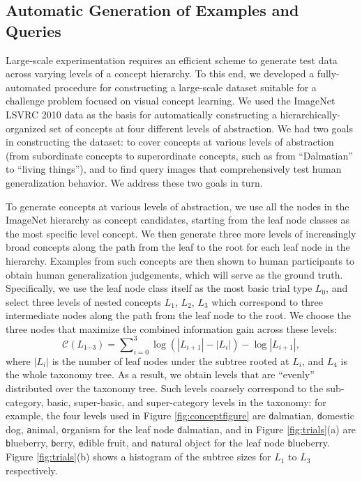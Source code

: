 \subsection{Automatic Generation of Examples and Queries}

Large-scale experimentation requires an efficient scheme to generate test data across varying levels of a concept hierarchy. To this end, we developed a fully-automated procedure for constructing a large-scale dataset suitable for a challenge problem focused on visual concept learning. We used the ImageNet LSVRC \cite{ilsvrc} 2010 data as the basis for automatically constructing a hierarchically-organized set of concepts at four different levels of abstraction. We had two goals in constructing the dataset: to cover concepts at various levels of abstraction (from subordinate concepts to superordinate concepts, such as from “Dalmatian” to “living things”), and to find query images that comprehensively test human generalization behavior. We address these two goals in turn.

To generate concepts at various levels of abstraction, we use all the nodes in the ImageNet hierarchy as concept candidates, starting from the leaf node classes as the most specific level concept. We then generate three more levels of increasingly broad concepts along the path from the leaf to the root for each leaf node in the hierarchy. Examples from such concepts are then shown to human participants to obtain human generalization judgements, which will serve as the ground truth. Specifically, we use the leaf node class itself as the most basic trial type $L_0$, and select three levels of nested concepts $L_1$, $L_2$, $L_3$ which correspond to three intermediate nodes along the path from the leaf node to the root. We choose the three nodes that maximize the combined information gain across these levels:
\begin{equation}
    \mathcal{C}(L_{1\cdots 3}) = \sum\nolimits_{i=0}^{3} \log(|L_{i+1}| - |L_{i}|) - \log|L_{i+1}|,
\end{equation}
where $|L_i|$ is the number of leaf nodes under the subtree rooted at $L_i$, and $L_4$ is the whole taxonomy tree. As a result, we obtain levels that are ``evenly'' distributed over the taxonomy tree. Such levels coarsely correspond to the sub-category, basic, super-basic, and super-category levels in the taxonomy: for example, the four levels used in Figure \ref{fig:conceptfigure} are {\texttt dalmatian}, {\texttt domestic dog}, {\texttt animal}, {\texttt organism} for the leaf node {\texttt dalmatian}, and in Figure \ref{fig:trials}(a) are {\texttt blueberry}, {\texttt berry}, {\texttt edible fruit}, and {\texttt natural object} for the leaf node {\texttt blueberry}. Figure \ref{fig:trials}(b) shows a histogram of the subtree sizes for $L_1$ to $L_3$ respectively.

